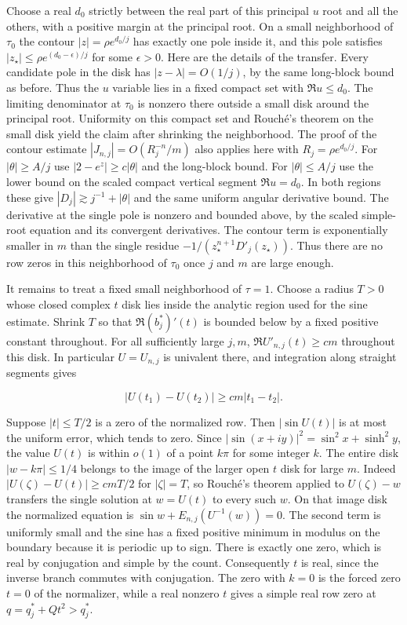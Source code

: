 \documentclass[11pt]{article}
\begin{document}
Choose a real \(d_0\) strictly between the real part of this principal \(u\) root and all the others, with a positive margin at the principal root. On a small neighborhood of \(\tau_0\) the contour \(|z|=\rho e^{d_0/j}\) has exactly one pole inside it, and this pole satisfies \(|z_\star|\le\rho e^{(d_0-\epsilon)/j}\) for some \(\epsilon>0\). Here are the details of the transfer. Every candidate pole in the disk has \(|z-\lambda|=O(1/j)\), by the same long-block bound as before. Thus the \(u\) variable lies in a fixed compact set with \(\Re u\le d_0\). The limiting denominator at \(\tau_0\) is nonzero there outside a small disk around the principal root. Uniformity on this compact set and Rouché's theorem on the small disk yield the claim after shrinking the neighborhood. The proof of the contour estimate \(|J_{n,j}|=O(R_j^{-n}/m)\) also applies here with \(R_j=\rho e^{d_0/j}\). For \(|\theta|\ge A/j\) use \(|2-e^z|\ge c|\theta|\) and the long-block bound. For \(|\theta|\le A/j\) use the lower bound on the scaled compact vertical segment \(\Re u=d_0\). In both regions these give \(|D_j|\gtrsim j^{-1}+|\theta|\) and the same uniform angular derivative bound. The derivative at the single pole is nonzero and bounded above, by the scaled simple-root equation and its convergent derivatives. The contour term is exponentially smaller in \(m\) than the single residue \(-1/(z_\star^{n+1}D'_j(z_\star))\). Thus there are no row zeros in this neighborhood of \(\tau_0\) once \(j\) and \(m\) are large enough.

It remains to treat a fixed small neighborhood of \(\tau=1\). Choose a radius \(T>0\) whose closed complex \(t\) disk lies inside the analytic region used for the sine estimate. Shrink \(T\) so that \(\Re (b_j^*)'(t)\) is bounded below by a fixed positive constant throughout. For all sufficiently large \(j,m\), \(\Re U'_{n,j}(t)\ge c m\) throughout this disk. In particular \(U=U_{n,j}\) is univalent there, and integration along straight segments gives

\begin{equation*}
|U(t_1)-U(t_2)|\ge c m|t_1-t_2|.
\end{equation*}

Suppose \(|t|\le T/2\) is a zero of the normalized row. Then \(|\sin U(t)|\) is at most the uniform error, which tends to zero. Since \(|\sin(x+iy)|^2=\sin^2 x+\sinh^2 y\), the value \(U(t)\) is within \(o(1)\) of a point \(k\pi\) for some integer \(k\). The entire disk \(|w-k\pi|\le1/4\) belongs to the image of the larger open \(t\) disk for large \(m\). Indeed \(|U(\zeta)-U(t)|\ge c m T/2\) for \(|\zeta|=T\), so Rouché's theorem applied to \(U(\zeta)-w\) transfers the single solution at \(w=U(t)\) to every such \(w\). On that image disk the normalized equation is \(\sin w+E_{n,j}(U^{-1}(w))=0\). The second term is uniformly small and the sine has a fixed positive minimum in modulus on the boundary because it is periodic up to sign. There is exactly one zero, which is real by conjugation and simple by the count. Consequently \(t\) is real, since the inverse branch commutes with conjugation. The zero with \(k=0\) is the forced zero \(t=0\) of the normalizer, while a real nonzero \(t\) gives a simple real row zero at \(q=q_j^*+Qt^2>q_j^*\).
\end{document}
